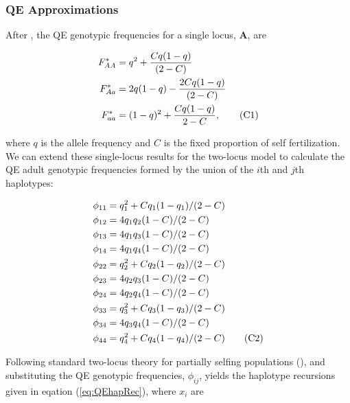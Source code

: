 \documentclass{article}
\newcommand\numberthis{\addtocounter{equation}{1}\tag{\theequation}}
\begin{document}
\subsubsection*{QE Approximations}

After \citet{CaballeroHill1992}, the QE genotypic frequencies for a single locus, $\mathbf{A}$, are

\begin{align*}
	F_{AA}^* &= q^2 + \frac{C q(1 - q)}{(2 - C)} \\
	F_{Aa}^* &= 2 q (1 - q) - \frac{2 C q(1 - q)}{(2 - C)} \\
	F_{aa}^* &= (1 - q)^2 + \frac{C q(1 - q)}{2 - C}, \numberthis 
\end{align*}

\noindent{} where $q$ is the allele frequency and $C$ is the fixed proportion of self fertilization. We can extend these single-locus results for the two-locus model to calculate the QE adult genotypic frequencies formed by the union of the $i$th and $j$th haplotypes:

\begin{align*}
	\phi_{11} &= q_1^2 + C q_1 (1 - q_1) / (2-C)  \\
	\phi_{12} &= 4 q_1 q_2 (1 - C) / (2-C)        \\
	\phi_{13} &= 4 q_1 q_3 (1 - C) / (2-C)        \\
	\phi_{14} &= 4 q_1 q_4 (1 - C) / (2-C)        \\
	\phi_{22} &= q_2^2 + C q_2 (1 - q_2) / (2-C)  \\
	\phi_{23} &= 4 q_2 q_3 (1 - C) / (2-C)        \\
	\phi_{24} &= 4 q_2 q_4 (1 - C) / (2-C)        \\
	\phi_{33} &= q_3^2 + C q_3 (1 - q_3) / (2-C)  \\
	\phi_{34} &= 4 q_3 q_4 (1 - C) / (2-C)        \\
	\phi_{44} &= q_4^2 + C q_4 (1 - q_4) / (2-C)  \numberthis
\end{align*}

Following standard two-locus theory for partially selfing populations (\citealt{Holden1979, OttoDay2007, JordanConn2014}), and substituting the QE genotypic frequencies, $\phi_{ij}$, yields the haplotype recursions given in eqation (\ref{eq:QEhapRec}), where $x_{i}$ are
\end{document}
